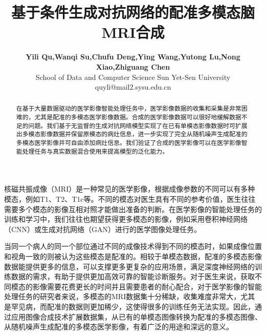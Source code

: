 \documentclass[letterpaper]{article} %
\title{基于条件生成对抗网络的配准多模态脑MRI合成}
\author{\Large \textbf{Yili Qu,Wanqi Su,Chufu Deng,Ying Wang,Yutong Lu,Nong Xiao,Zhiguang Chen}\\ %
School of Data and Computer Science Sun Yet-Sen University\\	
quyli@mail2.sysu.edu.cn%
}
\begin{document}
\maketitle

\begin{abstract}
在基于大量数据驱动的医学影像智能处理任务中，医学影像数据的收集和采集是非常困难的，尤其是配准的多模态医学影像数据。合成的医学影像数据可以很好地缓解数据不足的问题。我们基于无监督的生成对抗网络模型实现了在已有单模态影像数据时可扩展出多模态影像数据并保留原模态的病灶信息，进一步实现了完全从随机噪声生成配准的多模态医学影像并可自由添加病灶信息。我们验证了合成的医学影像可以在医学影像智能处理任务与真实数据混合使用来提高模型的泛化能力。
\end{abstract}

\noindent 
核磁共振成像（MRI）是一种常见的医学影像，根据成像参数的不同可以有多种模态，例如T1、T2、T1c等。不同的模态对医生具有不同的参考价值，医生往往需要多个模态的影像互相对照才能做出准备的判断。在医学影像的智能处理任务的训练和学习中，我们往往也期望获得更多模态的影像，例如采用卷积神经网络（CNN）或生成对抗网络（GAN）进行的医学图像处理任务。

当同一个病人的同一个部位通过不同的成像技术得到不同的模态时，如果成像位置和视角一致的则被认为这些模态是配准的。相较于单模态数据，配准的多模态影像数据能提供更多的信息，可以支撑更多更复杂的应用场景，满足深度神经网络的训练数据的需求，有助于提供更加高效可靠的智能诊断服务。对于医生来说，获取不同模态的影像需要花费更长的时间并且需要患者的耐心配合，对于医学影像的智能处理任务的研究者来说，多模态的MRI数据集十分稀缺，收集难度非常大，尤其是罕见病，而配准的数据则更加稀少，这使得很多的训练任务无法实现。因此，通过应用图像合成技术扩展数据集，从已有的单模态图像转换为配准的多模态图像、从随机噪声生成配准的多模态医学影像，有着广泛的用途和深远的意义。
\end{document}
